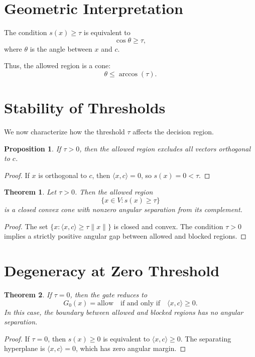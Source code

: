\documentclass[11pt]{article}
\theoremstyle{plain}
\newtheorem{theorem}{Theorem}
\newtheorem{proposition}{Proposition}
\theoremstyle{definition}
\begin{document}
\section{Geometric Interpretation}

The condition $s(x) \ge \tau$ is equivalent to
\[
\cos \theta \ge \tau,
\]
where $\theta$ is the angle between $x$ and $c$.

Thus, the allowed region is a cone:
\[
\theta \le \arccos(\tau).
\]

\section{Stability of Thresholds}

We now characterize how the threshold $\tau$ affects the decision region.

\begin{proposition}
If $\tau > 0$, then the allowed region excludes all vectors orthogonal to $c$.
\end{proposition}

\begin{proof}
If $x$ is orthogonal to $c$, then $\langle x, c \rangle = 0$, so $s(x)=0 < \tau$.
\end{proof}

\begin{theorem}
Let $\tau > 0$. Then the allowed region
\[
\{ x \in V : s(x) \ge \tau \}
\]
is a closed convex cone with nonzero angular separation from its complement.
\end{theorem}

\begin{proof}
The set $\{x : \langle x, c \rangle \ge \tau \|x\|\}$ is closed and convex. The condition $\tau > 0$ implies a strictly positive angular gap between allowed and blocked regions.
\end{proof}

\section{Degeneracy at Zero Threshold}

\begin{theorem}
If $\tau = 0$, then the gate reduces to
\[
G_0(x) = \text{allow} \quad \text{if and only if} \quad \langle x, c \rangle \ge 0.
\]
In this case, the boundary between allowed and blocked regions has no angular separation.
\end{theorem}

\begin{proof}
If $\tau = 0$, then $s(x) \ge 0$ is equivalent to $\langle x, c \rangle \ge 0$. The separating hyperplane is $\langle x, c \rangle = 0$, which has zero angular margin.
\end{proof}
\end{document}
